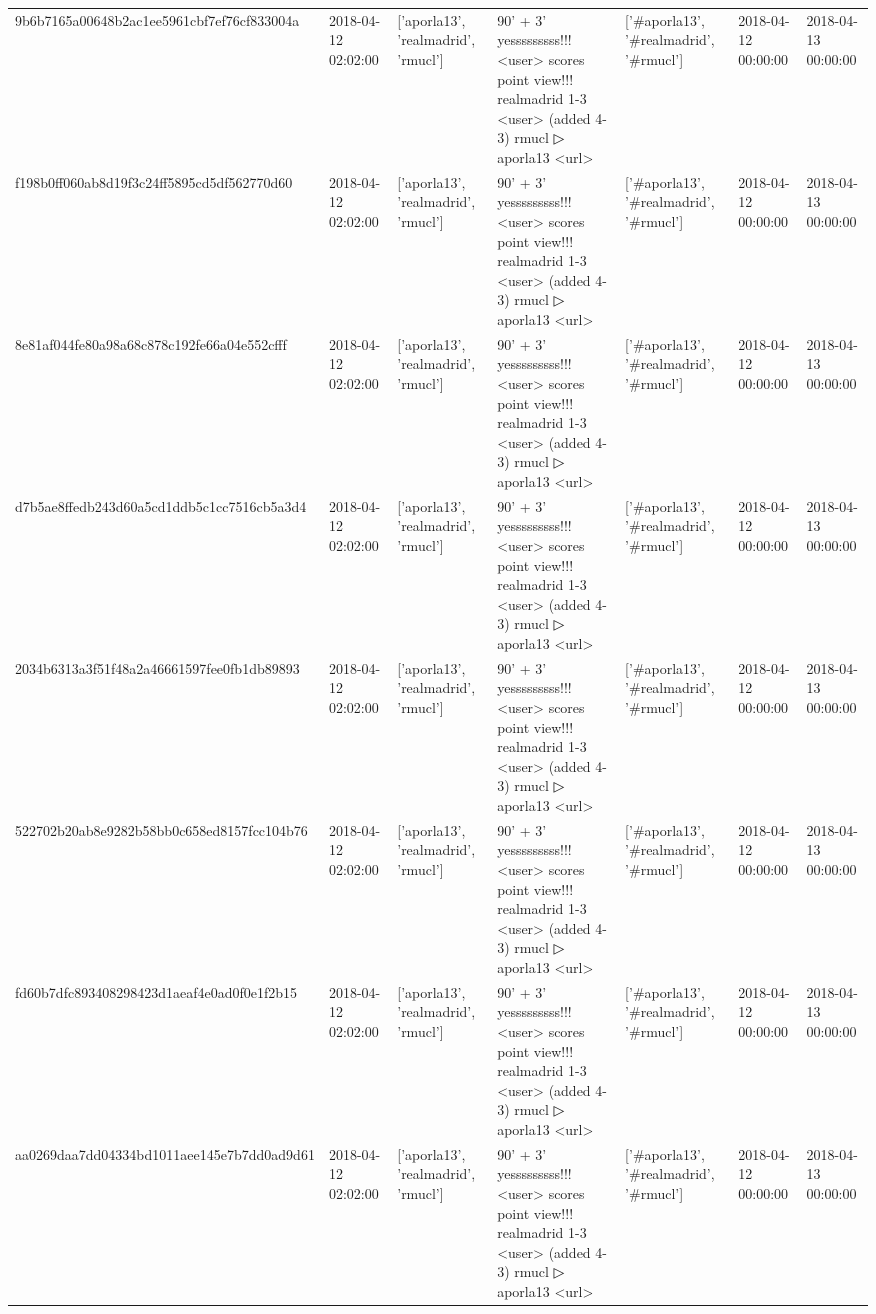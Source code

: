\begin{tabular}{lllllll}
9b6b7165a00648b2ac1ee5961cbf7ef76cf833004a & 2018-04-12 02:02:00 & ['aporla13', 'realmadrid', 'rmucl'] & 90' + 3' yesssssssss!!! <user> scores point view!!! realmadrid 1-3 <user> (added 4-3) rmucl ▷ aporla13 <url> & ['#aporla13', '#realmadrid', '#rmucl'] & 2018-04-12 00:00:00 & 2018-04-13 00:00:00 \\
f198b0ff060ab8d19f3c24ff5895cd5df562770d60 & 2018-04-12 02:02:00 & ['aporla13', 'realmadrid', 'rmucl'] & 90' + 3' yesssssssss!!! <user> scores point view!!! realmadrid 1-3 <user> (added 4-3) rmucl ▷ aporla13 <url> & ['#aporla13', '#realmadrid', '#rmucl'] & 2018-04-12 00:00:00 & 2018-04-13 00:00:00 \\
8e81af044fe80a98a68c878c192fe66a04e552cfff & 2018-04-12 02:02:00 & ['aporla13', 'realmadrid', 'rmucl'] & 90' + 3' yesssssssss!!! <user> scores point view!!! realmadrid 1-3 <user> (added 4-3) rmucl ▷ aporla13 <url> & ['#aporla13', '#realmadrid', '#rmucl'] & 2018-04-12 00:00:00 & 2018-04-13 00:00:00 \\
d7b5ae8ffedb243d60a5cd1ddb5c1cc7516cb5a3d4 & 2018-04-12 02:02:00 & ['aporla13', 'realmadrid', 'rmucl'] & 90' + 3' yesssssssss!!! <user> scores point view!!! realmadrid 1-3 <user> (added 4-3) rmucl ▷ aporla13 <url> & ['#aporla13', '#realmadrid', '#rmucl'] & 2018-04-12 00:00:00 & 2018-04-13 00:00:00 \\
2034b6313a3f51f48a2a46661597fee0fb1db89893 & 2018-04-12 02:02:00 & ['aporla13', 'realmadrid', 'rmucl'] & 90' + 3' yesssssssss!!! <user> scores point view!!! realmadrid 1-3 <user> (added 4-3) rmucl ▷ aporla13 <url> & ['#aporla13', '#realmadrid', '#rmucl'] & 2018-04-12 00:00:00 & 2018-04-13 00:00:00 \\
522702b20ab8e9282b58bb0c658ed8157fcc104b76 & 2018-04-12 02:02:00 & ['aporla13', 'realmadrid', 'rmucl'] & 90' + 3' yesssssssss!!! <user> scores point view!!! realmadrid 1-3 <user> (added 4-3) rmucl ▷ aporla13 <url> & ['#aporla13', '#realmadrid', '#rmucl'] & 2018-04-12 00:00:00 & 2018-04-13 00:00:00 \\
fd60b7dfc893408298423d1aeaf4e0ad0f0e1f2b15 & 2018-04-12 02:02:00 & ['aporla13', 'realmadrid', 'rmucl'] & 90' + 3' yesssssssss!!! <user> scores point view!!! realmadrid 1-3 <user> (added 4-3) rmucl ▷ aporla13 <url> & ['#aporla13', '#realmadrid', '#rmucl'] & 2018-04-12 00:00:00 & 2018-04-13 00:00:00 \\
aa0269daa7dd04334bd1011aee145e7b7dd0ad9d61 & 2018-04-12 02:02:00 & ['aporla13', 'realmadrid', 'rmucl'] & 90' + 3' yesssssssss!!! <user> scores point view!!! realmadrid 1-3 <user> (added 4-3) rmucl ▷ aporla13 <url> & ['#aporla13', '#realmadrid', '#rmucl'] & 2018-04-12 00:00:00 & 2018-04-13 00:00:00 \\

\end{tabular}
